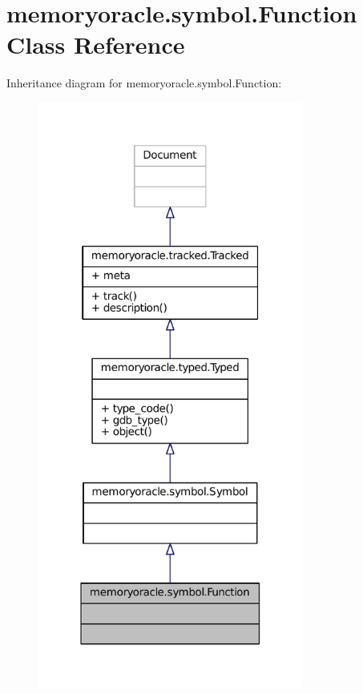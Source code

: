 \hypertarget{classmemoryoracle_1_1symbol_1_1Function}{}\section{memoryoracle.\+symbol.\+Function Class Reference}
\label{classmemoryoracle_1_1symbol_1_1Function}


Inheritance diagram for memoryoracle.\+symbol.\+Function\+:
\nopagebreak
\begin{figure}[H]
\begin{center}
\leavevmode
\includegraphics[width=247pt]{classmemoryoracle_1_1symbol_1_1Function__inherit__graph}
\end{center}
\end{figure}



